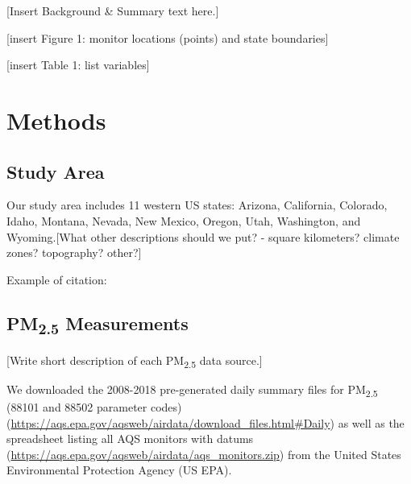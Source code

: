 \documentclass[english]{article}
\begin{document}
[Insert Background \& Summary text here.]

[insert Figure 1:  monitor locations (points) and state boundaries]

[insert Table 1: list variables]


\section*{Methods}


\subsection*{Study Area}

Our study area includes 11 western US states: Arizona, California, Colorado, Idaho, Montana, Nevada, New Mexico, Oregon, Utah, Washington, and Wyoming.[What other descriptions should we put? - square kilometers? climate zones? topography? other?] 

Example of citation: \cite{liu_estimating_2005}

\subsection*{PM\textsubscript{2.5} Measurements}

[Write short description of each PM\textsubscript{2.5} data source.]

We downloaded the 2008-2018 pre-generated daily summary files for PM\textsubscript{2.5} (88101 and 88502 parameter codes)  (\url{https://aqs.epa.gov/aqsweb/airdata/download_files.html#Daily}) as well as the spreadsheet listing all AQS monitors with datums (\url{https://aqs.epa.gov/aqsweb/airdata/aqs_monitors.zip}) 
from the United States Environmental Protection Agency (US EPA).
\end{document}
